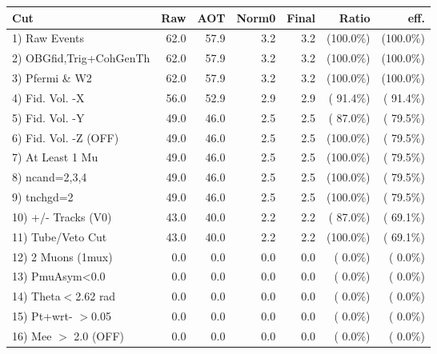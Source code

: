  \begin{table}[h!]\centering
 \begin{tabular}{||l||r|r|r|r|r|r||}
 \hline
 \hline
 Cut & Raw & AOT & Norm0 & Final & Ratio & eff.       \\
 \hline
  1) Raw Events           &         62.0 &         57.9 &          3.2 &          3.2 & (100.0\%) & (100.0\%) \\
  2) OBGfid,Trig+CohGenTh &         62.0 &         57.9 &          3.2 &          3.2 & (100.0\%) & (100.0\%) \\
  3) Pfermi \& W2         &         62.0 &         57.9 &          3.2 &          3.2 & (100.0\%) & (100.0\%) \\
  4) Fid. Vol. -X         &         56.0 &         52.9 &          2.9 &          2.9 & ( 91.4\%) & ( 91.4\%) \\
  5) Fid. Vol. -Y         &         49.0 &         46.0 &          2.5 &          2.5 & ( 87.0\%) & ( 79.5\%) \\
  6) Fid. Vol. -Z (OFF)   &         49.0 &         46.0 &          2.5 &          2.5 & (100.0\%) & ( 79.5\%) \\
  7) At Least 1 Mu        &         49.0 &         46.0 &          2.5 &          2.5 & (100.0\%) & ( 79.5\%) \\
  8) ncand=2,3,4          &         49.0 &         46.0 &          2.5 &          2.5 & (100.0\%) & ( 79.5\%) \\
  9) tnchgd=2             &         49.0 &         46.0 &          2.5 &          2.5 & (100.0\%) & ( 79.5\%) \\
 10) +/- Tracks (V0)      &         43.0 &         40.0 &          2.2 &          2.2 & ( 87.0\%) & ( 69.1\%) \\
 11) Tube/Veto Cut        &         43.0 &         40.0 &          2.2 &          2.2 & (100.0\%) & ( 69.1\%) \\
 12) 2 Muons (1mux)       &          0.0 &          0.0 &          0.0 &          0.0 & (  0.0\%) & (  0.0\%) \\
 13) PmuAsym<0.0          &          0.0 &          0.0 &          0.0 &          0.0 & (  0.0\%) & (  0.0\%) \\
 14) Theta$<$2.62 rad     &          0.0 &          0.0 &          0.0 &          0.0 & (  0.0\%) & (  0.0\%) \\
 15) Pt+wrt- $>$0.05      &          0.0 &          0.0 &          0.0 &          0.0 & (  0.0\%) & (  0.0\%) \\
 16) Mee $>$ 2.0  (OFF)   &          0.0 &          0.0 &          0.0 &          0.0 & (  0.0\%) & (  0.0\%) \\

\end{tabular}
\end{table}
